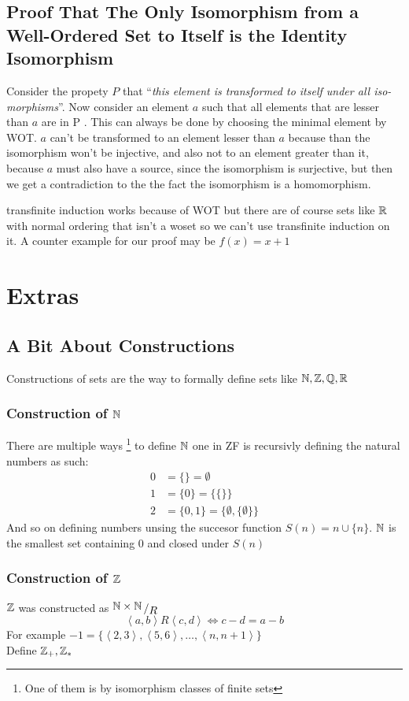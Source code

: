 \documentclass[11pt,a4paper]{article}
\begin{document}
\subsection{Proof That The Only Isomorphism from a Well-Ordered Set to Itself 
is the Identity Isomorphism}
Consider the propety $P$ that 
``\emph{this element is transformed to itself under all iso-
morphisms}''. 
Now consider an element $a$ such that all elements that are lesser
than $a$ are in P . This can always be done by choosing the minimal element
by WOT. $a$ can’t be transformed to an element lesser than $a$ because than
the isomorphism won’t be injective, and also not to an element greater than
it, because $a$ must also have a source, since the isomorphism is surjective, 
but then we get a contradiction to the the fact the isomorphism is a
homomorphism.
\begin{remark}
	transfinite induction works because of WOT but there are of course sets
	like $\mathbb{R}$ with normal ordering that isn’t a woset so we can’t use 
	transfinite induction on it. 
	A counter example for our proof may be $f(x) = x + 1$
\end{remark}

\newpage

\section{Extras}
\subsection{A Bit About Constructions}
Constructions of sets are the way to formally define sets like $\mathbb{N},\mathbb{Z},\mathbb{Q},\mathbb{R}$
\subsubsection{Construction of \texorpdfstring{$\mathbb{N}$}{N}}
There are multiple ways
\footnote{One of them is by isomorphism classes of finite sets} 
to define $\mathbb{N}$ one in ZF is recursivly defining the natural
numbers as such:
\begin{align*}
	0 &= \{\} = \emptyset \\
	1 &= \{0\} = \{\{\}\} \\
	2 &= \{0,1\} = \{\emptyset,\{\emptyset\}\}
\end{align*}
And so on defining numbers unsing the succesor function $S(n)=n\cup\{n\}$.
$\mathbb{N}$ is the smallest set containing $0$ and closed under $S(n)$
\subsubsection{Construction of \texorpdfstring{$\mathbb{Z}$}{Z}}
$\mathbb{Z}$ was constructed as $\bigslant{\N\times\N}{R}$
\[
	\left<a,b\right>R\left<c,d\right> \iff c-d=a-b
\]
For example 
$-1=\{\left<2,3\right>,\left<5,6\right>,\ldots,\left<n,n+1\right>\}$\\
Define $\mathbb{Z}_+,\mathbb{Z}_*$
\end{document}
